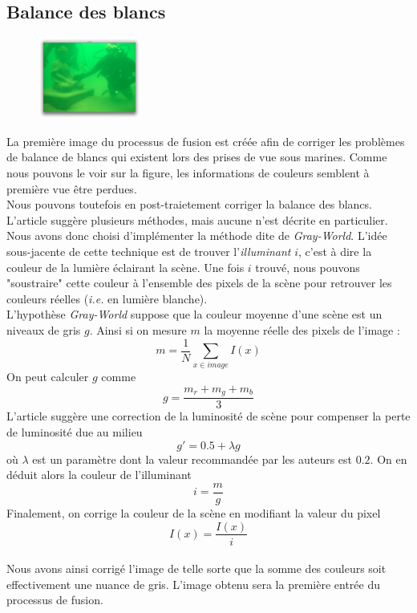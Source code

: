 \documentclass[twoside]{article}
\begin{document}
\subsection{Balance des blancs}
\begin{figure}
  \begin{center}
    \includegraphics[width=0.3\textwidth]{Support/input.png}
  \end{center}
\end{figure}

La première image du processus de fusion est créée afin de corriger les problèmes de balance de blancs qui existent lors des prises de vue sous marines. Comme nous pouvons le voir sur la figure, les informations de couleurs semblent à première vue être perdues.\\
Nous pouvons toutefois en post-traietement corriger la balance des blancs. L'article suggère plusieurs méthodes, mais aucune n'est décrite en particulier. Nous avons donc choisi d'implémenter la méthode dite de \emph{Gray-World}. L'idée sous-jacente de cette technique est de trouver l'\emph{illuminant} $i$, c'est à dire la couleur de la lumière éclairant la scène. Une fois $i$ trouvé, nous pouvons "soustraire" cette couleur à l'ensemble des pixels de la scène pour retrouver les couleurs réelles (\emph{i.e.} en lumière blanche).\\
L'hypothèse \emph{Gray-World} suppose que la couleur moyenne d'une scène est un niveaux de gris $g$. Ainsi si on mesure $m$ la moyenne réelle des pixels de l'image : $$m = \frac{1}{N}\sum_{x \in image}I(x)$$ On peut calculer $g$ comme $$g = \frac{m_r + m_g + m_b}{3}$$ L'article suggère une correction de la luminosité de scène pour compenser la perte de luminosité due au milieu $$g' = 0.5 + \lambda g$$ où $\lambda$ est un paramètre dont la valeur recommandée par les auteurs est $0.2$. On en déduit alors la couleur de l'illuminant $$ i = \frac{m}{g}$$ Finalement, on corrige la couleur de la scène en modifiant la valeur du pixel $$I(x) = \frac{I(x)}{i}$$\\
Nous avons ainsi corrigé l'image de telle sorte que la somme des couleurs soit effectivement une nuance de gris. L'image obtenu sera la première entrée du processus de fusion.
\end{document}
